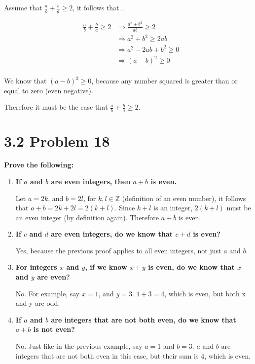 \documentclass[10pt]{article}
\begin{document}
Assume that $\frac{a}{b} + \frac{b}{a} \geq 2$, it follows that...

\begin{align*}
    && \frac{a}{b} + \frac{b}{a} \geq 2 &\Rightarrow \frac{a^2 + b^2}{ab} \geq 2 &\\
    && &\Rightarrow a^2 + b^2 \geq 2ab &\\
    && &\Rightarrow a^2 - 2ab + b^2 \geq 0 &\\
    && &\Rightarrow (a - b)^2 \geq 0 &\\
\end{align*}

We know that $(a-b)^2 \geq 0$, because any number squared is greater than or equal to zero (even negative).

Therefore it must be the case that $\frac{a}{b} + \frac{b}{a} \geq 2$.

\section{3.2 Problem 18}
\textbf{Prove the following:}

\begin{enumerate}[label=(\alph*)]

    \item \textbf{If $a$ and $b$ are even integers, then $a+b$ is even.}

        Let $a = 2k$, and $b = 2l$, for $k,l \in \mathbb{Z}$ (definition of an even number),
        it follows that $a + b = 2k + 2l = 2(k + l)$.  Since $k + l$ is an integer, $2(k + l)$
        must be an even integer (by definition again).  Therefore $a + b$ is even.


    \item \textbf{If $c$ and $d$ are even integers, do we know that $c+d$ is even?}

        Yes, because the previous proof applies to all even integers, not just $a$ and $b$.


    \item \textbf{For integers $x$ and $y$, if we know $x+y$ is even, do we know that $x$ and $y$
        are even?}

        No.  For example, say $x = 1$, and $y = 3$.  $1 + 3 = 4$, which is even, but both x and y are odd.


    \item \textbf{If $a$ and $b$ are integers that are not both even, do we know that $a+b$ is
        not even?}

        No.  Just like in the previous example, say $a = 1$ and $b = 3$.  $a$ and $b$ are integers that are not
        both even in this case, but their sum is 4, which is even.

\end{enumerate}
\end{document}
